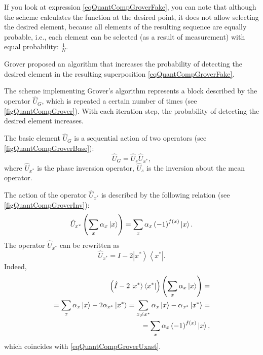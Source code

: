 

If you look at expression \eqref{eqQuantCompGroverFake}, you can
note that although the scheme calculates
the function at the desired point, it does not allow selecting the desired
element, because all elements of the resulting sequence are equally probable, i.e., each element can be selected (as a result
of measurement) with equal probability: $\frac{1}{N}$.

Grover proposed an algorithm that increases the
probability of detecting the desired element in the resulting
superposition \eqref{eqQuantCompGroverFake}.





The scheme implementing Grover's algorithm represents a block
described by the operator $\hat{U}_G$, which is repeated a certain number
of times (see \autoref{figQuantCompGrover}). With each
iteration step, the probability of detecting the desired element increases.

The basic element $\hat{U}_G$ is a sequential action
of two operators (see \autoref{figQuantCompGroverBase}):
\begin{equation}
\hat{U}_G=\hat{U}_s\hat{U}_{x^{\ast}},
\nonumber
\end{equation}
where $\hat{U}_{x^{\ast}}$ is the phase inversion operator, $\hat{U}_s$
is the inversion about the mean operator.



The action of the operator $\hat{U}_{x^{\ast}}$ is described by the following relation
(see \autoref{figQuantCompGroverInv}):
\begin{equation}
\hat{U}_{x^{\ast}}\left(\sum_x \alpha_x \ket{x}\right) = 
\sum_x \alpha_x \left(-1\right)^{f\left(x\right)}\ket{x}.
\label{eqQuantCompGroverUxast}
\end{equation} 
The operator $\hat{U}_{x^{\ast}}$ can be rewritten as
\begin{equation}
\hat{U}_{x^{\ast}} = \hat{I} - 2 \left|x^{\ast}\right>\left<x^{\ast}\right|.
\nonumber
\end{equation} 
Indeed,
\begin{eqnarray}
\left(\hat{I} - 2 \left|x^{\ast}\right>\left<x^{\ast}\right|\right)
\left(\sum_x \alpha_x \ket{x}\right) =
\nonumber \\
= \sum_x \alpha_x \ket{x} - 2 \alpha_{x^{\ast}}
\left|x^{\ast}\right> = 
\sum_{x\ne x^{\ast}} \alpha_x \ket{x} -  \alpha_{x^{\ast}}
\left|x^{\ast}\right> =
\nonumber \\
=
\sum_x \alpha_x \left(-1\right)^{f\left(x\right)}\ket{x},
\nonumber
\end{eqnarray}
which coincides with \eqref{eqQuantCompGroverUxast}.

